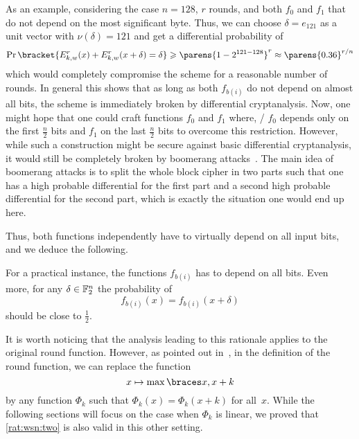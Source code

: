As an example, considering the case $n=128$, $r$ rounds, and both $f_0$ and $f_1$ that do not depend on the most significant byte.
Thus, we can choose $\delta = e_{121}$ as a unit vector with $\nu(\delta)=121$ and get a differential probability of
\begin{equation*}
    \Pr\bracket{E_{k,w}^r(x)+E_{k,w}^r(x+\delta)=\delta} \geqslant \parens{1-2^{121-128}}^{r} \approx \parens{0.36}^{r/n}
\end{equation*}
which would completely compromise the scheme for a reasonable number of rounds.
In general this shows that as long as both $f_{b(i)}$ do not depend on almost all bits, the scheme is immediately broken by differential cryptanalysis.
Now, one might hope that one could craft functions $f_0$ and $f_1$ where, \eg/ $f_0$ depends only on the first $\frac{n}{2}$ bits and $f_1$ on the last $\frac{n}{2}$ bits to overcome this restriction.
However, while such a construction might be secure against basic differential cryptanalysis, it would still be completely broken by boomerang attacks~\cite{FSE:Wagner99}.
The main idea of boomerang attacks is to split the whole block cipher in two parts such that one has a high probable differential for the first part and a second high probable differential for the second part, which is exactly the situation one would end up here.

Thus, both functions independently have to virtually depend on all input bits, and we deduce the following.
\begin{rationale}\label{rat:wsn:two}
    For a practical instance, the functions $f_{b(i)}$ has to depend on all bits.
    Even more, for any $\delta \in \mathbb{F}_2^n$ the probability of
    \begin{equation*}
        f_{b(i)}(x)=f_{b(i)}(x+\delta)
    \end{equation*}
    should be close to $\frac{1}{2}$.
\end{rationale}

It is worth noticing that the analysis leading to this rationale applies to the original round function.
However, as pointed out in~\cite[Section~3.1]{AC:Tessaro15}, in the definition of the round function, we can replace the function
\begin{equation*}
    x \mapsto \max\set{x, x + k}
\end{equation*}
by any function $\Phi_k$ such that $\Phi_k(x)=\Phi_k(x+k)$ for all~$x$.
While the following sections will focus on the case when $\Phi_k$ is linear, we proved that \cref{rat:wsn:two} is also valid in this other setting.


